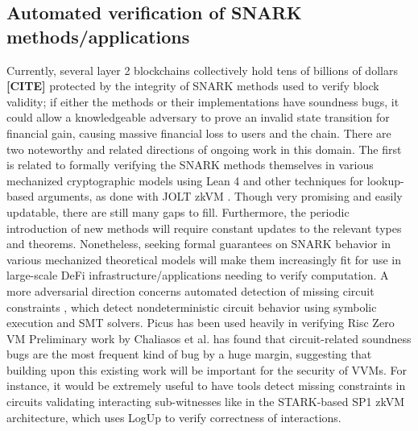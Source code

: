 \subsection{Automated verification of SNARK methods/applications}
\noindent Currently, several layer 2 blockchains collectively hold tens of billions of dollars \textbf{[CITE]} protected by the integrity of SNARK methods used to verify block validity; if either the methods or their implementations have soundness bugs, it could allow a knowledgeable adversary to prove an invalid state transition for financial gain, causing massive financial loss to users and the chain. There are two noteworthy and related directions of ongoing work in this domain. The first is related to formally verifying the SNARK methods themselves in various mechanized cryptographic models using Lean 4 \cite{arklib, lean4} and other techniques for lookup-based arguments, as done with JOLT zkVM \cite{jolt, joltfv}. Though very promising and easily updatable, there are still many gaps to fill. Furthermore, the periodic introduction of new methods will require constant updates to the relevant types and theorems. Nonetheless, seeking formal guarantees on SNARK behavior in various mechanized theoretical models will make them increasingly fit for use in large-scale DeFi infrastructure/applications needing to verify computation. A more adversarial direction concerns automated detection of missing circuit constraints \cite{picus}, which detect nondeterministic circuit behavior using symbolic execution and SMT solvers. Picus has been used heavily in verifying Risc Zero VM \cite{risc0} Preliminary work by Chaliasos et al. \cite{sok} has found that circuit-related soundness bugs are the most frequent kind of bug by a huge margin, suggesting that building upon this existing work will be important for the security of VVMs. For instance, it would be extremely useful to have tools detect missing constraints in circuits validating interacting sub-witnesses like in the STARK-based SP1 zkVM architecture, which uses LogUp \cite{logup} to verify correctness of interactions.
%


